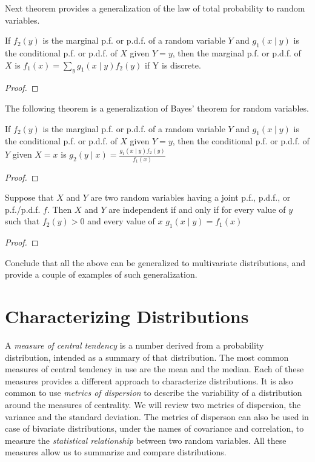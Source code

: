 {\color{red} Next theorem provides a generalization of the law of total probability to random variables.}

\begin{proposition}
If $f_{2}\left(y\right)$ is the marginal p.f. or p.d.f. of a random variable $Y$ and $g_{1}\left(x\mid y\right)$ is the conditional p.f. or p.d.f. of $X$ given $Y=y$, then the marginal p.f. or p.d.f. of $X$ is $f_{1}\left(x\right)=\sum_{y}g_{\text{1}}\left(x\mid y\right)f_{2}\left(y\right)$
if Y is discrete.
\end{proposition}
\begin{proof}
\end{proof}

{\color{red} The following theorem is a generalization of Bayes' theorem for random variables.}

\begin{theorem}
If $f_{2}\left(y\right)$ is the marginal p.f. or p.d.f. of a random variable $Y$ and $g_{1}\left(x\mid y\right)$ is the conditional p.f. or p.d.f. of $X$ given $Y=y$, then the conditional p.f. or p.d.f. of $Y$ given $X=x$ is $g_{2}\left(y\mid x\right)=\frac{g_{1}\left(x\mid y\right)f_{2}\left(y\right)}{f_{1}\left(x\right)}$
\end{theorem}
\begin{proof}
\end{proof}

\begin{proposition}
Suppose that $X$ and $Y$ are two random variables having a joint p.f., p.d.f., or p.f./p.d.f. $f$. Then $X$ and $Y$ are independent if and only if for every value of $y$ such that $f_{2}\left(y\right)>0$ and every value of $x$ $g_{1}\left(x\mid y\right)=f_{1}\left(x\right)$
\end{proposition}
\begin{proof}
\end{proof}

{\color{red} Conclude that all the above can be generalized to multivariate distributions, and provide a couple of examples of such generalization.}

%
%

\section{Characterizing Distributions}
\label{sec:probability_expectation}

A \emph{measure of central tendency} is a number derived from a probability distribution, intended as a summary of that distribution. The most common measures of central tendency in use are the mean and the median. Each of these measures provides a different approach to characterize distributions. It is also common to use \emph{metrics of dispersion} to describe the variability of a distribution around the measures of centrality. We will review two metrics of dispersion, the variance and the standard deviation. The metrics of disperson can also be used in case of bivariate distributions, under the names of covariance and correlation, to measure the \emph{statistical relationship} between two random variables. All these measures allow us to summarize and compare distributions.


